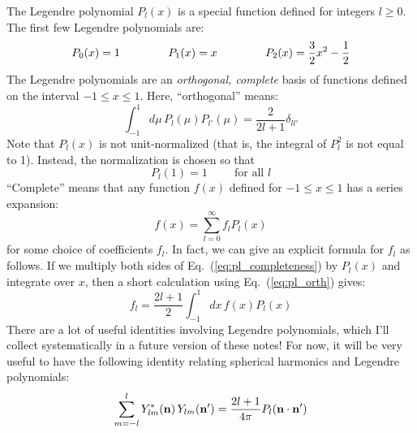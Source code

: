\documentclass[aps,prd,superscriptaddress,groupedaddress,nofootinbib,nobibnotes]{revtex4}
\newcommand{\be}{\begin{equation}}
\newcommand{\ee}{\end{equation}}
\def\n{{\bf n}}
\begin{document}
The Legendre polynomial $P_l(x)$ is a special function defined for integers $l \ge 0$.
The first few Legendre polynomials are:
\be
P_0(x) = 1
  \hspace{1.5cm}
P_1(x) = x
  \hspace{1.5cm}
P_2(x) = \frac{3}{2}x^2 - \frac{1}{2}
\ee
The Legendre polynomials are an {\em orthogonal, complete} basis of functions defined on the interval $-1 \le x \le 1$.
Here, ``orthogonal'' means:
\be
\int_{-1}^1 d\mu \, P_l(\mu) P_{l'}(\mu) = \frac{2}{2l+1} \delta_{ll'}  \label{eq:pl_orth}
\ee
Note that $P_l(x)$ is not unit-normalized (that is, the integral of $P_l^2$ is not equal to 1).
Instead, the normalization is chosen so that
\be
P_l(1) = 1 \hspace{1cm} \mbox{for all $l$}
\ee
``Complete'' means that any function $f(x)$ defined for $-1 \le x \le 1$ has a series expansion:
\be
f(x) = \sum_{l=0}^\infty f_l P_l(x)  \label{eq:pl_completeness}
\ee
for some choice of coefficients $f_l$.
In fact, we can give an explicit formula for $f_l$ as follows.  
If we multiply both sides of Eq.~(\ref{eq:pl_completeness})
by $P_l(x)$ and integrate over $x$, then a short calculation using Eq.~(\ref{eq:pl_orth}) gives:
\be
f_l = \frac{2l+1}{2} \int_{-1}^1 dx \, f(x) P_l(x)
\ee
There are a lot of useful identities involving Legendre polynomials, which I'll collect systematically
in a future version of these notes!  For now, it will be very useful to have the following identity
relating spherical harmonics and Legendre polynomials:
\be
\sum_{m=-l}^l Y_{lm}^*(\n) \, Y_{lm}(\n') = \frac{2l+1}{4\pi} P_l(\n\cdot\n')
\ee
\end{document}
